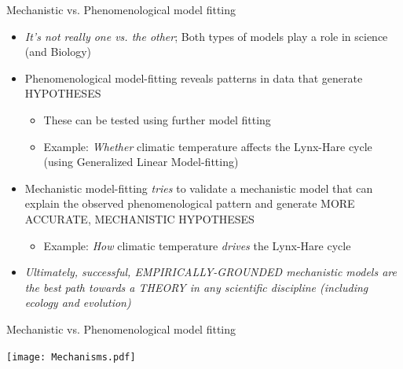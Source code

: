 \documentclass[xcolor=x11names,compress]{beamer}
\renewcommand{\(}{\begin{columns}}
\renewcommand{\)}{\end{columns}}
\newcommand{\<}[1]{\begin{column}{#1}}
\renewcommand{\>}{\end{column}}
\begin{document}
\begin{frame}{Mechanistic vs. Phenomenological model fitting}

	\begin{itemize}[<+->]\itemsep10pt
		\item {\it It's not really one vs. the other}; Both types of models play a role in science (and Biology)
		\item Phenomenological model-fitting reveals patterns in data that generate HYPOTHESES 
 		\begin{itemize}
			\item These can be tested using further model fitting
			\item Example: {\it Whether} climatic temperature affects the Lynx-Hare cycle (using Generalized Linear Model-fitting)
		\end{itemize} 

		\item Mechanistic model-fitting {\it tries} to validate a mechanistic model that can explain the observed phenomenological pattern and generate MORE ACCURATE, MECHANISTIC HYPOTHESES
		\begin{itemize}
			\item Example: {\it How} climatic temperature {\it drives} the Lynx-Hare cycle
		\end{itemize} 
		\item \it Ultimately, successful, EMPIRICALLY-GROUNDED mechanistic models are the best path towards a THEORY in any scientific discipline (including ecology and evolution)  
	  \end{itemize}
 
 
 \end{frame}

\begin{frame}{Mechanistic vs. Phenomenological model fitting}
	 
  \begin{center}
	  \texttt{[image: Mechanisms.pdf]}
  \end{center} 
 
 \end{frame}
\end{document}

